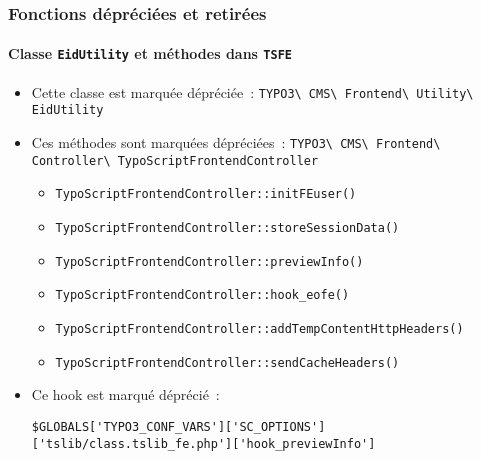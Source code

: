 
\begin{frame}[fragile]
	\frametitle{Fonctions dépréciées et retirées}
	\framesubtitle{Classe \texttt{EidUtility} et méthodes dans \texttt{TSFE}}

	\lstset{basicstyle=\tiny\ttfamily}

	\begin{itemize}
		\item Cette classe est marquée dépréciée~:\newline
			\smaller\texttt{TYPO3\textbackslash
				CMS\textbackslash
				Frontend\textbackslash
				Utility\textbackslash
				EidUtility}\normalsize

		\item Ces méthodes sont marquées dépréciées~:\newline
			\smaller\texttt{TYPO3\textbackslash
				CMS\textbackslash
				Frontend\textbackslash
				Controller\textbackslash
				TypoScriptFrontendController}\normalsize

				\begin{itemize}\smaller
					\item \texttt{TypoScriptFrontendController::initFEuser()}
					\item \texttt{TypoScriptFrontendController::storeSessionData()}
					\item \texttt{TypoScriptFrontendController::previewInfo()}
					\item \texttt{TypoScriptFrontendController::hook\_eofe()}
					\item \texttt{TypoScriptFrontendController::addTempContentHttpHeaders()}
					\item \texttt{TypoScriptFrontendController::sendCacheHeaders()}
				\end{itemize}

			\item Ce hook est marqué déprécié~:

				\begin{lstlisting}
$GLOBALS['TYPO3_CONF_VARS']['SC_OPTIONS']['tslib/class.tslib_fe.php']['hook_previewInfo']
				\end{lstlisting}

	\end{itemize}

\end{frame}

